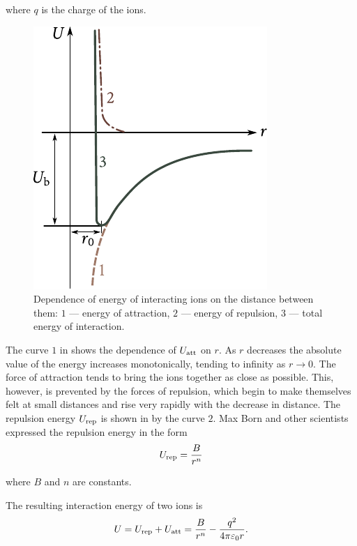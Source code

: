 \noindent
where $q$ is the charge of the ions.

\begin{figure}[t]
	\begin{center}
		\includegraphics[scale=0.95]{figures/ch_01/fig_1_4.pdf}
		\caption[]{Dependence of energy of interacting ions on the distance between them: $1$ --- energy of attraction, $2$ --- energy of repulsion, $3$ --- total energy of interaction.}
		\label{fig:1_4}
	\end{center}
	\vspace{-0.7cm}
\end{figure}

The curve $1$ in  shows the dependence of $U_{\text{att}}$ on $r$. As $r$ decreases the absolute value of the energy increases monotonically, tending to infinity as $r\to 0$. The force of attraction tends to bring the ions together as close as possible. This, however, is
prevented by the forces of repulsion, which begin to make themselves felt at small distances and rise very rapidly with the decrease in distance. The repulsion energy $U_{\text{rep}}$ is shown in  by the curve $2$. Max Born and other scientists expressed the repulsion energy in the form
\begin{equation}\label{eq:1_7}
	U_{\text{rep}} = \frac{B}{r^n}
\end{equation}

\noindent
where $B$ and $n$ are constants.

The resulting interaction energy of two ions is
\begin{equation}\label{eq:1_8}
	U = U_{\text{rep}} + U_{\text{att}} = \frac{B}{r^n} - \frac{q^2}{4\pi\varepsilon_0 r}.
\end{equation}

